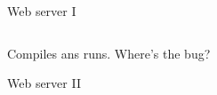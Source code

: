 \documentclass[10pt]{beamer}
\begin{document}
	
	\begin{frame}[t,fragile]{Web server I}
		\inputminted{go}{code/11_server.go}
		\pause
		Compiles ans runs. Where's the bug?
	\end{frame}
					
	
	\begin{frame}[fragile]{Web server II}
		\inputminted{go}{code/12_mutex.go}
	\end{frame}
	
	
	\begin{frame}[t,fragile]{}
		\begin{center}
		\end{center}
		\begin{verbatim}
		\end{verbatim}
	\end{frame}
	
	
	\begin{frame}[fragile]{}
		\begin{verbatim}
		\end{verbatim}
	\end{frame}

	
	\begin{frame}[t,fragile]{}
	\end{frame}
\end{document}
